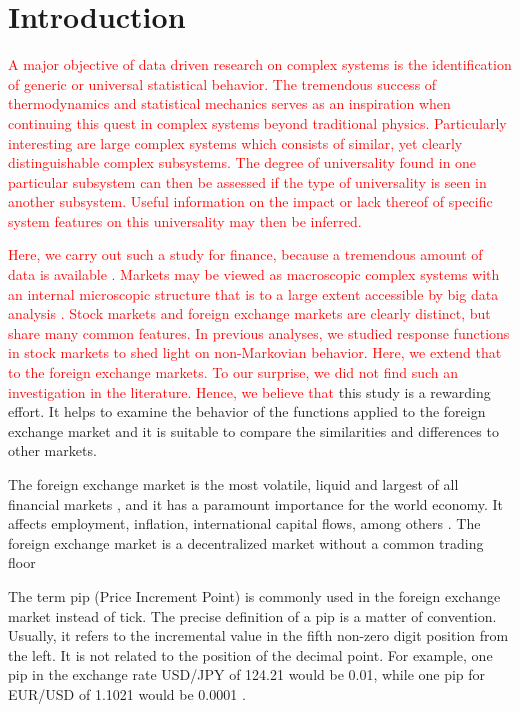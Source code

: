 \section{Introduction}\label{sec:introduction}

\textcolor{red}{
A major objective of data driven research on complex systems is the
identification of generic or universal statistical behavior. The tremendous
success of thermodynamics and statistical mechanics serves as an inspiration
when continuing this quest in complex systems beyond traditional physics.
Particularly interesting are large complex systems which consists of similar,
yet clearly distinguishable complex subsystems. The degree of universality
found in one particular subsystem can then be assessed if the type of
universality is seen in another subsystem. Useful information on the impact or
lack thereof of specific system features on this universality may then be
inferred.}

\textcolor{red}{
Here, we carry out such a study for finance, because a tremendous amount of
data is available \cite{physicists_contribution}. Markets may be viewed as
macroscopic complex systems with an internal microscopic structure that is to a
large extent accessible by big data analysis \cite{complex_markets}.
Stock markets and foreign exchange markets are clearly distinct, but share
many common features. In previous analyses, we studied response functions in
stock markets to shed light on non-Markovian behavior. Here, we extend that to
the foreign exchange markets. To our surprise, we did not find such an
investigation in the literature. Hence, we believe that}
this study is a rewarding effort. It helps to examine the behavior of the
functions applied to the foreign exchange market and it is suitable to compare
the similarities and differences to other markets.

The foreign exchange market is the most volatile, liquid and largest of all
financial markets
\cite{forex_liquidity,info_forex,forex_market_micro,intraday_forex}, and it has
a paramount importance for the world economy. It affects employment, inflation,
international capital flows, among others \cite{forex_structure}. The foreign
exchange market is a decentralized market without a common trading floor
\cite{info_forex,forex_market_micro,forex_structure,teach_spread}

The term pip (Price Increment Point) is commonly used in the foreign exchange
market instead of tick. The precise definition of a pip is a matter of
convention. Usually, it refers to the incremental value in the fifth non-zero
digit position from the left. It is not related to the position of the decimal
point. For example, one pip in the exchange rate USD/JPY of 124.21 would be
0.01, while one pip for EUR/USD of 1.1021 would be 0.0001
\cite{forex_market_micro,forex_structure,order_flow_forex,micro_eff}.

